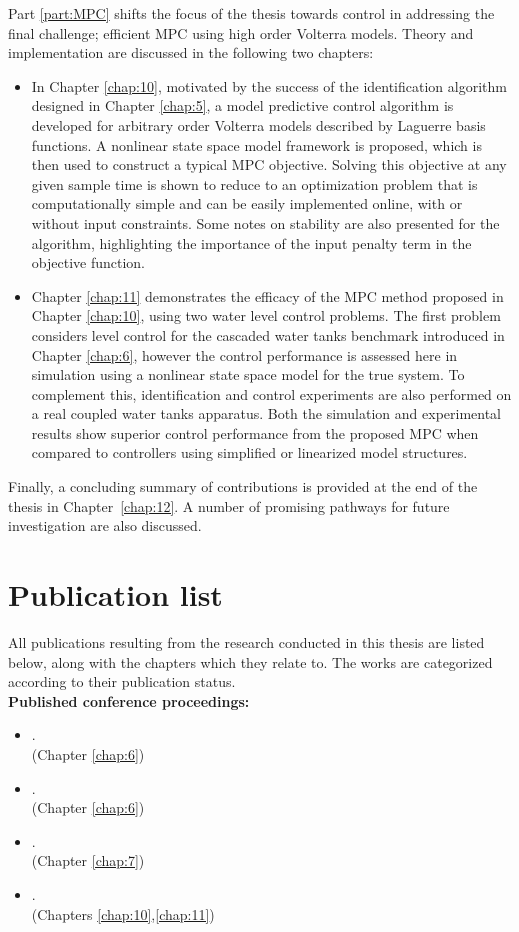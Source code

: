 Part \ref{part:MPC} shifts the focus of the thesis towards control in addressing the final challenge; efficient MPC using high order Volterra models. Theory and implementation are discussed in the following two chapters:
\begin{itemize}
\item In Chapter \ref{chap:10}, motivated by the success of the identification algorithm designed in Chapter \ref{chap:5}, a model predictive control algorithm is developed for arbitrary order Volterra models described by Laguerre basis functions. A nonlinear state space model framework is proposed, which is then used to construct a typical MPC objective. Solving this objective at any given sample time is shown to reduce to an optimization problem that is computationally simple and can be easily implemented online, with or without input constraints. Some notes on stability are also presented for the algorithm, highlighting the importance of the input penalty term in the objective function.
\item Chapter \ref{chap:11} demonstrates the efficacy of the MPC method proposed in Chapter \ref{chap:10}, using two water level control problems. The first problem considers level control for the cascaded water tanks benchmark introduced in Chapter \ref{chap:6}, however the control performance is assessed here in simulation using a nonlinear state space model for the true system. To complement this, identification and control experiments are also performed on a real coupled water tanks apparatus. Both the simulation and experimental results show superior control performance from the proposed MPC when compared to controllers using simplified or linearized model structures.
\end{itemize}

Finally, a concluding summary of contributions is provided at the end of the thesis in Chapter~\ref{chap:12}. A number of promising pathways for future investigation are also discussed.

\section{Publication list}

All publications resulting from the research conducted in this thesis are listed below, along with the chapters which they relate to. The works are categorized according to their publication status.
\null \\

\textbf{Published conference proceedings:}
\begin{itemize}
\item {}. \\ \null \hfill (Chapter \ref{chap:6})
\item {}. \\ \null \hfill (Chapter \ref{chap:6})
\item {}. \\ \null \hfill (Chapter \ref{chap:7})
\item {}. \\ \null \hfill (Chapters \ref{chap:10},\ref{chap:11})
\end{itemize}

